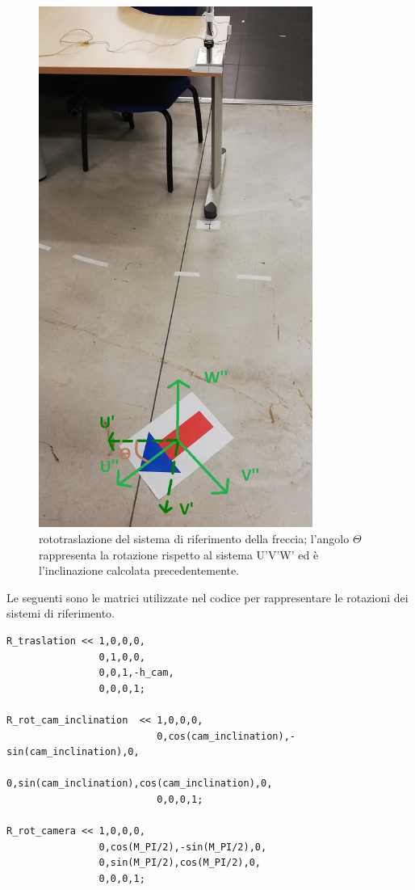 \begin{figure}[H]
	\centering
	\includegraphics[width=0.8\textwidth]{Immagini/camera_opposite_pov_2.jpg}
	\caption{rototraslazione del sistema di riferimento della freccia; l'angolo $\Theta$rappresenta la rotazione rispetto al sistema U'V'W' ed è l'inclinazione calcolata precedentemente.}
	\label{fig:rot_frame}
\end{figure}
Le seguenti sono le matrici utilizzate nel codice per rappresentare le rotazioni dei sistemi di riferimento.
\begin{lstlisting}
R_traslation << 1,0,0,0,
				0,1,0,0,
				0,0,1,-h_cam,
				0,0,0,1;

R_rot_cam_inclination  << 1,0,0,0,
					      0,cos(cam_inclination),-sin(cam_inclination),0,
						  0,sin(cam_inclination),cos(cam_inclination),0,
						  0,0,0,1;

R_rot_camera << 1,0,0,0,
				0,cos(M_PI/2),-sin(M_PI/2),0,
				0,sin(M_PI/2),cos(M_PI/2),0,
				0,0,0,1;
\end{lstlisting}